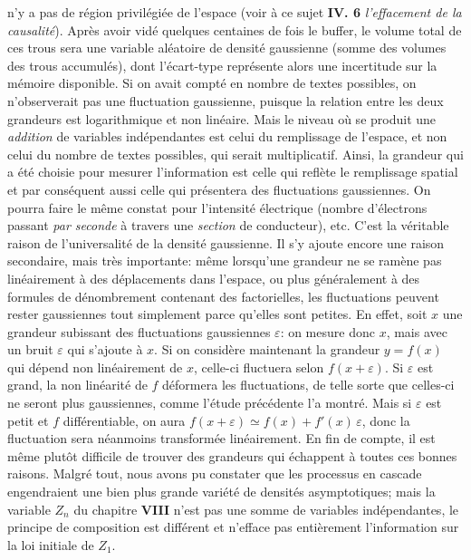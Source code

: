 n'y a pas de r\'egion privil\'egi\'ee de l'espace (voir \`a ce sujet {\bf IV. 
6} {\it l'effacement de la  causalit\'e}).  
\medskip 
Apr\`es avoir vid\'e quelques centaines de fois le buffer,  le volume  
total de ces trous sera une variable al\'eatoire de densit\'e gaussienne 
(somme des volumes des trous accumul\'es),  dont l'\'ecart-type 
repr\'esente alors une incertitude sur la m\'emoire disponible.  Si on 
avait compt\'e en nombre de textes possibles,  on n'observerait pas une 
fluctuation gaussienne,  puisque la relation entre les deux grandeurs est 
logarithmique et non lin\'eaire.  Mais le niveau o\`u se produit une 
{\it addition} de variables ind\'ependantes est celui du remplissage  
de l'espace,  et non celui du nombre de textes possibles,  qui serait 
multiplicatif.  Ainsi, la grandeur qui a \'et\'e choisie pour mesurer 
l'information est celle qui refl\`ete le remplissage spatial et par 
cons\'equent aussi celle qui pr\'esentera des fluctuations gaussiennes.  
\medskip 
On pourra faire le m\^eme constat pour l'intensit\'e \'electrique (nombre 
d'\'electrons passant {\it par seconde} \`a travers  une {\it section} de 
conducteur), etc.  
\medskip 
C'est la v\'eritable raison de l'universalit\'e de la densit\'e gaussienne. 
Il s'y ajoute encore une raison secondaire,  mais tr\`es importante: 
m\^eme lorsqu'une grandeur ne se ram\`ene pas lin\'eairement \`a des 
d\'eplacements dans l'espace,  ou plus g\'en\'eralement \`a des formules  
de d\'enombrement contenant des factorielles,  les fluctuations peuvent 
rester gaussiennes tout simplement parce qu'elles sont petites.  En 
effet,  soit $x$ une grandeur subissant des fluctuations gaussiennes 
$\varepsilon$:  on mesure donc $x$,  mais avec un bruit $\varepsilon$  
qui s'ajoute \`a $x$.  Si on consid\`ere maintenant la grandeur $y = f(x)$  
qui d\'epend non lin\'eairement de $x$,  celle-ci fluctuera selon 
$f(x+\varepsilon )$.  Si $\varepsilon$ est grand,  la non lin\'earit\'e de  
$f$ d\'eformera les fluctuations,  de telle sorte que celles-ci ne seront 
plus gaussiennes,  comme l'\'etude pr\'ec\'edente l'a montr\'e.  Mais si 
$\varepsilon$ est petit et $f$ diff\'erentiable,  on aura $f(x+\varepsilon ) 
\simeq f(x) + f'(x)\, \varepsilon$,  donc la fluctuation sera n\'eanmoins 
transform\'ee lin\'eairement.  En fin de compte,  il est m\^eme plut\^ot 
difficile de trouver des grandeurs qui \'echappent \`a toutes ces bonnes 
raisons. 
\medskip 
Malgr\'e tout,  nous avons pu constater que les processus en cascade 
engendraient une bien plus grande vari\'et\'e de densit\'es 
asymptotiques;  mais la  variable $Z_n$ du chapitre {\bf VIII} n'est pas 
une somme de variables ind\'ependantes,  le principe de composition est 
diff\'erent et n'efface pas enti\`erement l'information sur la loi  
initiale de $Z_1$. 
 
